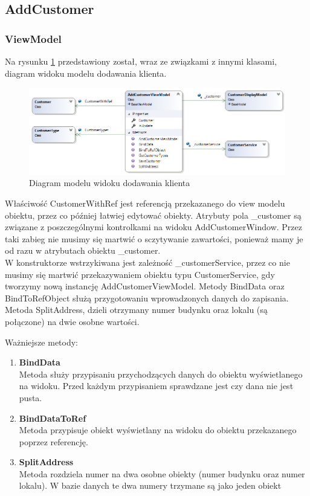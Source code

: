 \subsection{AddCustomer}

\subsubsection{ViewModel}
Na rysunku \ref{fig:addCustomerViewModelDiagram} przedstawiony został, wraz ze związkami z innymi klasami, diagram widoku modelu dodawania klienta. 

\begin{figure}[ht!]
  \includegraphics[width=\linewidth]{Rysunki/AddCustomerViewModelDiagram.png}
  \caption{Diagram modelu widoku dodawania klienta}
  \label{fig:addCustomerViewModelDiagram}
\end{figure}

Właściwość CustomerWithRef jest referencją przekazanego do view modelu obiektu, przez co później łatwiej edytować obiekty.
Atrybuty pola \_customer są związane z poszczególnymi kontrolkami na widoku AddCustomerWindow. Przez taki zabieg nie musimy się martwić o sczytywanie zawartości, ponieważ mamy je od razu w atrybutach obiektu \_customer. 
\\
W konstruktorze wstrzykiwana jest zależność \_customerService, przez co nie musimy się martwić przekazywaniem obiektu typu CustomerService, gdy tworzymy nową instancję AddCustomerViewModel. Metody BindData oraz BindToRefObject służą przygotowaniu wprowadzonych danych do zapisania. Metoda SplitAddress, dzieli otrzymany numer budynku oraz lokalu (są połączone) na dwie osobne wartości. 

Ważniejsze metody:

\begin{enumerate}
    \item \textbf{BindData} \\
    Metoda służy przypisaniu przychodzących danych do obiektu wyświetlanego na widoku. Przed każdym przypisaniem sprawdzane jest czy dana nie jest pusta. 
    \\
    \item \textbf{BindDataToRef} \\
    Metoda przypisuje obiekt wyświetlany na widoku do obiektu przekazanego poprzez referencję. 
    \\
    \item \textbf{SplitAddress} \\
    Metoda rozdziela numer na dwa osobne obiekty (numer budynku oraz numer lokalu). W bazie danych te dwa numery trzymane są jako jeden obiekt
\end{enumerate}

